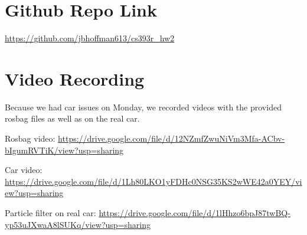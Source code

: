 \section{Github Repo Link}

\url{https://github.com/jbhoffman613/cs393r_hw2}

\section{Video Recording}

Because we had car issues on Monday, we recorded videos with the provided rosbag files as well as on the real car.

Rosbag video: 
\url{https://drive.google.com/file/d/12NZmfZwuNiVm3Mfa-ACbv-bIgumRVTiK/view?usp=sharing}

Car video:
\url{https://drive.google.com/file/d/1Lh80LKO1yFDHc0NSG35KS2wWE42a0YEY/view?usp=sharing}

Particle filter on real car:
\url{https://drive.google.com/file/d/1lHhzo6bpJ87twBQ-yp53uJXwaA8lSUKq/view?usp=sharing}



